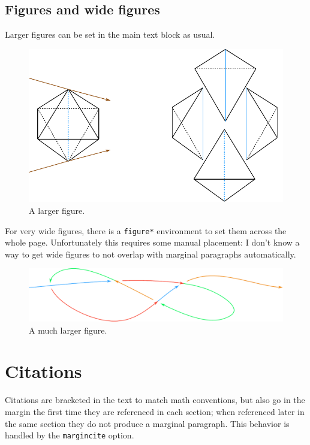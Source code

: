 \documentclass[margincite]{sl2ams}
\begin{document}
\subsection{Figures and wide figures}
Larger figures can be set in the main text block as usual.
\begin{figure}
  \centering
  \includegraphics{fig-example.pdf}
  \caption{A larger figure.}%
  \label{fig:fig-example}
\end{figure}
For very wide figures, there is a \texttt{figure*} environment to set them across the whole page.
Unfortunately this requires some manual placement: I don't know a way to get wide figures to not overlap with marginal paragraphs automatically.
\begin{figure}
  \centering
  \includegraphics{wide-fig-example.pdf}
  \caption{A much larger figure.}%
  \label{fig:wide-fig-example}
\end{figure}

\section{Citations}
Citations are bracketed in the text \cite{Graham1994} to match math conventions, but also go in the margin the first time they are referenced in each section; when referenced later \cite{Graham1994} in the same section they do not produce a marginal paragraph.%
This behavior is handled by the \texttt{margincite} option.


\printbibliography
  
\end{document}
